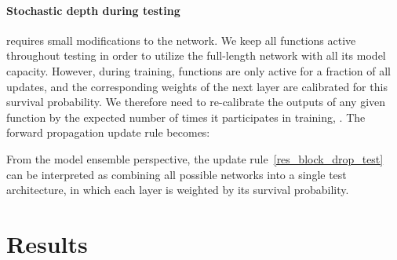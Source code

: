 \documentclass[runningheads]{llncs}
\begin{document}
\paragraph{\textbf{Stochastic depth during testing}} requires small modifications to the network. We keep all functions  active throughout testing in order to utilize the full-length network with all its model capacity. However, during training, functions  are only active for a fraction  of all updates, and the corresponding weights of the next layer are calibrated for this survival probability. We therefore need to re-calibrate the outputs of any given function  by the expected number of times it participates in training, . The forward propagation update rule becomes:

From the model ensemble perspective, the update rule~\eqref{res_block_drop_test} can be interpreted as combining all possible networks into a single test architecture, in which each layer is weighted by its survival probability.
 


\section{Results}

\label{sec_results}
\end{document}
